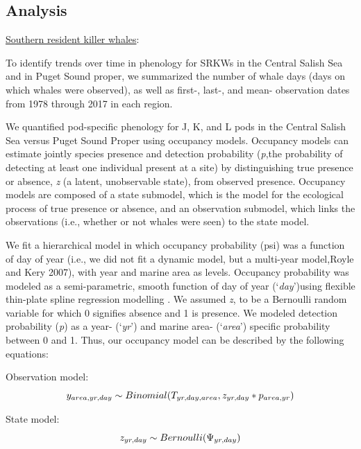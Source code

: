 \documentclass{article}
\begin{document}
\subsection* {Analysis}
\underline{Southern resident killer whales}:
\par To identify trends over time in phenology for SRKWs in the Central Salish Sea and in Puget Sound proper, we summarized the number of whale days (days on which whales were observed), as well as first-, last-, and mean- observation dates from 1978 through 2017 in each region. 

\par We quantified pod-specific phenology for J, K, and L pods in the Central Salish Sea versus Puget Sound Proper using occupancy models. Occupancy models can estimate jointly species presence and detection probability (\emph{p},the probability of detecting at least one individual present at a site) by distinguishing true presence or absence, \emph{z} (a latent, unobservable state), from observed presence. Occupancy models are composed of a state submodel, which is the model for the ecological process of true presence or absence, and  an observation submodel, which links the observations (i.e., whether or not whales were seen) to the state model.
\par We fit a hierarchical model in which occupancy probability (psi) was a function of day of year (i.e., we did not fit a dynamic model, but a multi-year model,Royle and Kery 2007), with year and marine area as levels. Occupancy probability was modeled as a semi-parametric, smooth function of day of year (`\emph{day}')using flexible thin-plate spline regression modelling \citep{strebel2014}. We assumed \emph{z}, to be a Bernoulli random variable for which 0 signifies absence and 1 is presence. We modeled detection probability (\emph{p}) as a year- (`\emph{yr}') and marine area- (`\emph{area}') specific probability between 0 and 1. Thus, our occupancy model can be described by the following equations:

\par Observation model:
\begin{equation} 
y_{area,yr,day} \sim Binomial (T_{yr,day,area}, z_{yr,day} * p_{area,yr})\\
\end{equation}

\par State model:
\begin{equation} 
z_{yr,day} \sim Bernoulli (\mathrm{\Psi}_{yr,day})\\
\end{equation}
\end{document}
